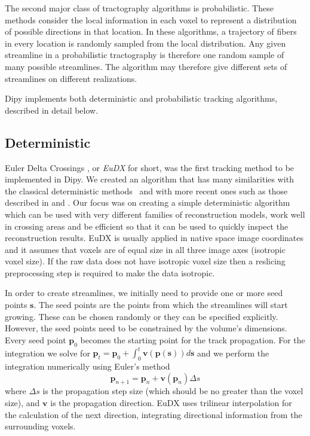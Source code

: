 \documentclass{bioinfo}
\begin{document}
The second major class of tractography algorithms is probabilistic. These
methods consider the local
information in each voxel to represent a distribution of possible directions in
that location. In these algorithms, a trajectory of fibers in every location is
randomly sampled from the local distribution. Any given streamline in a probabilistic
tractography is therefore one random sample of many possible streamlines.  The
algorithm may therefore give different sets of streamlines on different
realizations.

Dipy implements both deterministic and probabilistic tracking algorithms,
described in detail below.

\subsection{Deterministic}
Euler Delta Crossings \citep{Garyfallidis_thesis}, or \emph{EuDX} for short, was the first tracking
method to be implemented in Dipy. We created an algorithm that has many
similarities with the classical deterministic methods~\citep{Mori1999,
  conturo-lori-etal:99, basser-pajevic-etal:00} and with more recent ones such as
those described in \citet{descoteaux-deriche-etal:09} and
\citet{yeh-etal:10}. Our focus was on creating a simple
deterministic algorithm which can be used with very different families of
reconstruction models, work well in crossing areas and be efficient so that it
can be used to quickly inspect the reconstruction results. EuDX is usually applied
in native space image coordinates and it assumes that voxels are of equal size
in all three image axes (isotropic voxel size). If the raw data does not have
isotropic voxel size then a reslicing preprocessing step is
required to make the data isotropic.

In order to create streamlines, we initially need to provide one or more seed
points $\mathbf{s}$. The seed points are the points from which the streamlines will start growing. These can
be chosen randomly or they can be specified explicitly. However, the seed
points need to be constrained by the volume's dimensions. Every seed point
$\mathbf{p}_{0}$ becomes the starting point for the track propagation. For the
integration we solve for
$\mathbf{p}_{t}=\mathbf{p}_{0}+\int_{0}^{t}\mathbf{v}(\mathbf{p}(\mathbf{s}))d\mathbf{s}$
and we perform the integration numerically using Euler's method
\begin{equation}
\mathbf{p}_{n+1}=\mathbf{p}_{n}+\mathbf{v}(\mathbf{p}_{n})\Delta s\label{eq:euler}
\end{equation}
\noindent where $\Delta s$ is the propagation step size (which should be no
greater than the voxel size), and $\mathbf{v}$ is the propagation
direction. EuDX uses trilinear interpolation for the calculation
of the next direction, integrating directional information from the surrounding
voxels.
\end{document}
